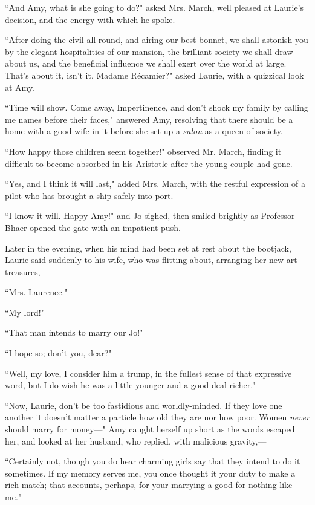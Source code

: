 ``And Amy, what is she going to do?" asked Mrs. March, well pleased at
Laurie's decision, and the energy with which he spoke.

``After doing the civil all round, and airing our best bonnet, we shall
astonish you by the elegant hospitalities of our mansion, the brilliant
society we shall draw about us, and the beneficial influence we shall
exert over the world at large. That's about it,
isn't it, Madame Récamier?" asked Laurie, with a
quizzical look at Amy.

``Time will show. Come away, Impertinence, and don't
shock my family by calling me names before their faces," answered Amy,
resolving that there should be a home with a good wife in it before she
set up a \emph{salon} as a queen of society.

``How happy those children seem together!" observed Mr. March, finding it
difficult to become absorbed in his Aristotle after the young couple had
gone.

``Yes, and I think it will last," added Mrs. March, with the restful
expression of a pilot who has brought a ship safely into port.

``I know it will. Happy Amy!" and Jo sighed, then smiled brightly as
Professor Bhaer opened the gate with an impatient push.

Later in the evening, when his mind had been set at rest about the
bootjack, Laurie said suddenly to his wife, who was flitting about,
arranging her new art treasures,---

``Mrs. Laurence."

``My lord!"

``That man intends to marry our Jo!"

``I hope so; don't you, dear?"

``Well, my love, I consider him a trump, in the fullest sense of that
expressive word, but I do wish he was a little younger and a good deal
richer."

``Now, Laurie, don't be too fastidious and
worldly-minded. If they love one another it doesn't
matter a particle how old they are nor how poor. Women \emph{never}
should marry for money---" Amy caught herself up short as the words
escaped her, and looked at her husband, who replied, with malicious
gravity,---

``Certainly not, though you do hear charming girls say that they intend
to do it sometimes. If my memory serves me, you once thought it your
duty to make a rich match; that accounts, perhaps, for your marrying a
good-for-nothing like me."

